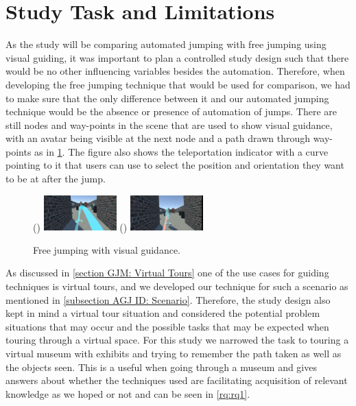 \section{Study Task and Limitations}
\label{section DPUS: Study Task and Limitations}
As the study will be comparing automated jumping with free jumping using visual guiding, it was important to plan a controlled study design such that there would be no other influencing variables besides the automation. Therefore, when developing the free jumping technique that would be used for comparison, we had to make sure that the only difference between it and our automated jumping technique would be the absence or presence of automation of jumps. There are still nodes and way-points in the scene that are used to show visual guidance, with an avatar being visible at the next node and a path drawn through way-points as in \cref{fig:study-free-jumping}. The figure also shows the teleportation indicator with a curve pointing to it that users can use to select the position and orientation they want to be at after the jump.

\begin{figure}[]
	()
	\includegraphics[width=0.25\textwidth]{images/free-jumping.pdf}
	()
	\includegraphics[width=0.25\textwidth]{images/automated-jumping.pdf}
	\caption{Free jumping with visual guidance.}
	\label{fig:study-free-jumping}
\end{figure}

As discussed in \cref{section GJM: Virtual Tours} one of the use cases for guiding techniques is virtual tours, and we developed our technique for such a scenario as mentioned in \cref{subsection AGJ ID: Scenario}. Therefore, the study design also kept in mind a virtual tour situation and considered the potential problem situations that may occur and the possible tasks that may be expected when touring through a virtual space. For this study we narrowed the task to touring a virtual museum with exhibits and trying to remember the path taken as well as the objects seen. This is a useful when going through a museum and gives answers about whether the techniques used are facilitating acquisition of relevant knowledge as we hoped or not and can be seen in \cref{rq:rq1}.


